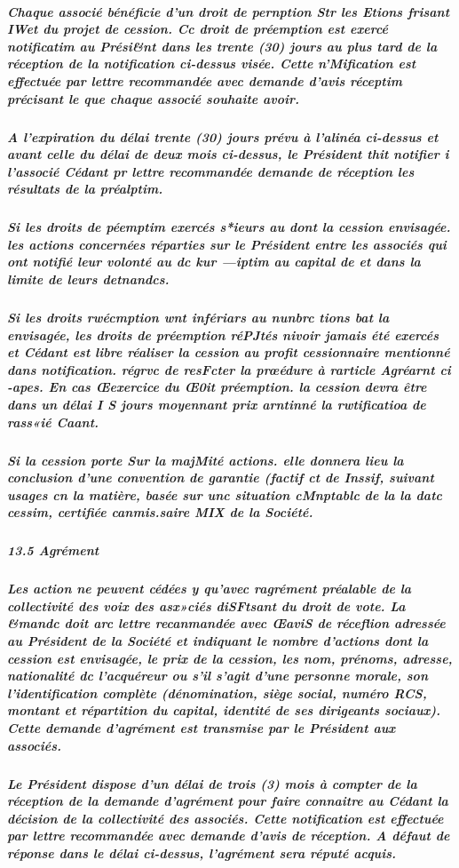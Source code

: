 \documentclass[a4paper, 11pt]{article}
\begin{document}
\subparagraph{
  Chaque associé bénéficie d'un droit de pernption Str les Etions frisant IWet du projet de cession. Cc droit de préemption est exercé notificatim au Prési&nt dans les trente (30) jours au plus tard de la réception de la notification ci-dessus visée. Cette n'Mification est effectuée par lettre recommandée avec demande d'avis réceptim précisant le que chaque associé souhaite avoir.
}

\subparagraph{
  A l'expiration du délai trente (30) jours prévu à l'alinéa ci-dessus et avant celle du délai de deux mois ci-dessus, le Président thit notifier i l'associé Cédant pr lettre recommandée demande de réception les résultats de la préalptim.
}

\subparagraph{
  Si les droits de péemptim exercés s*ieurs au dont la cession envisagée. les actions concernées réparties sur le Président entre les associés qui ont notifié leur volonté au dc kur —iptim au capital de et dans la limite de leurs detnandcs.
}

\subparagraph{
  Si les droits rwécmption wnt infériars au nunbrc tions bat la envisagée, les droits de préemption réPJtés nivoir jamais été exercés et Cédant est libre réaliser la cession au profit cessionnaire mentionné dans notification. régrvc de resFcter la prœédure à rarticle Agréarnt  ci -apes.  En cas Œexercice du Œ0it préemption. la cession devra être dans un délai I S jours moyennant prix arntinné la rwtificatioa de rass«ié Caant.
}

\subparagraph{
  Si la cession porte Sur la majMité actions. elle donnera lieu la conclusion d'une convention de garantie (factif ct de Inssif, suivant usages cn la matière, basée sur unc situation cMnptablc de la la datc cessim, certifiée canmis.saire MIX de la Société.
}

\subparagraph{
  13.5 Agrément
}

\subparagraph{
  Les action ne peuvent cédées y qu'avec ragrément préalable de la collectivité des voix des asx»ciés diSFtsant du droit de vote. La &mandc doit arc lettre recanmandée avec ŒaviS de réceflion adressée au Président de la Société et indiquant le nombre d'actions dont la cession est envisagée, le prix de la cession, les nom, prénoms, adresse, nationalité dc l'acquéreur ou s'il s'agit d'une personne morale, son l'identification complète (dénomination, siège social, numéro RCS, montant et répartition du capital, identité de ses dirigeants sociaux). Cette demande d'agrément est transmise par le Président aux associés.
}

\subparagraph{
  Le Président dispose d'un délai de trois (3) mois à compter de la réception de la demande d'agrément pour faire connaitre au Cédant la décision de la collectivité des associés. Cette notification est effectuée par lettre recommandée avec demande d'avis de réception. A défaut de réponse dans le délai ci-dessus, l'agrément sera réputé acquis.
}
\end{document}
